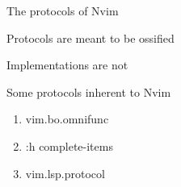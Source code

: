 \documentclass{beamer}
\begin{document}
\begin{frame}{The protocols of Nvim}

	Protocols are meant to be ossified

	Implementations are not

	Some protocols inherent to Nvim

	\begin{enumerate}

		\item vim.bo.omnifunc

		\item :h complete-items

		\item vim.lsp.protocol

	\end{enumerate}

\end{frame}
\end{document}

